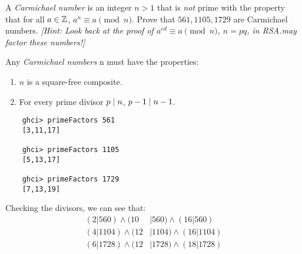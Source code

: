 \begin{problem}
A \emph{Carmichael number} is an integer $n>1$ that is \emph{not}
prime with the property that for all $a \in \mathbb{Z}$, $a^n \equiv a
\pmod{n}$.  Prove that $561,1105,1729$ are Carmichael numbers.
\emph{[Hint: Look back at the proof of $a^{ed} \equiv a \pmod{n}$, $n=pq$, in RSA.\@You may factor these numbers!]}
\end{problem}

\begin{Answer}
  Any \emph{Carmichael numbers} n must have the properties:
  \begin{enumerate}
    \item $n$ is a square-free composite.
    \item For every prime divisor $p\;\zaff{|}\;n$, $p-1\; \zaff{|}\; n-1$.
  \end{enumerate}

  \color{zaffre}
  \begin{Verbatim}
    ghci> primeFactors 561
    [3,11,17]

    ghci> primeFactors 1105
    [5,13,17]
    
    ghci> primeFactors 1729
    [7,13,19]
  \end{Verbatim}
  \color{black}

  Checking the divisors, we can see that:
  \begin{align}
     (2 | 560) \land (10 &| 560) \land (16 | 560) \\
    (4 | 1104) \land (12 &| 1104) \land (16 | 1104) \\
    (6 | 1728) \land (12 &| 1728) \land (18 | 1728)
  \end{align}
\end{Answer}
